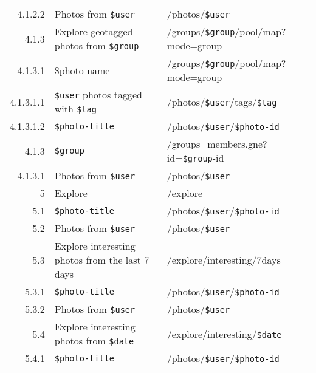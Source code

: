 \documentclass[11pt,a4paper]{article}
\newcommand{\var}[1]{\texttt{\${#1}}}
\begin{document}
\begin{center}
\begin{small}
\begin{longtable}{rp{5cm}l}
            4.1.2.2 &
            Photos from \var{user} &
            /photos/\var{user} \\

          4.1.3 &
          Explore geotagged photos from \var{group}  &
          /groups/\var{group}/pool/map?mode=group \\

            4.1.3.1 &
            \$photo-name &
            /groups/\var{group}/pool/map?mode=group \\

              4.1.3.1.1 &
              \var{user} photos tagged with \var{tag} &
              /photos/\var{user}/tags/\var{tag} \\

              4.1.3.1.2 &
              \var{photo-title} &
              /photos/\var{user}/\var{photo-id} \\

          4.1.3 &
          \var{group}  &
          /groups\_members.gne?id=\var{group}-id \\

            4.1.3.1 &
            Photos from \var{user} &
            /photos/\var{user} \\


      5 &
      Explore &
      /explore \\

        5.1 &
        \var{photo-title} &
        /photos/\var{user}/\var{photo-id} \\

        5.2 &
        Photos from \var{user} &
        /photos/\var{user} \\

        5.3 &
        Explore interesting photos from the last 7 days &
        /explore/interesting/7days \\

          5.3.1 &
          \var{photo-title} &
          /photos/\var{user}/\var{photo-id} \\

          5.3.2 &
          Photos from \var{user} &
          /photos/\var{user} \\

        5.4 &
        Explore interesting photos from \var{date} &
        /explore/interesting/\var{date} \\

          5.4.1 &
          \var{photo-title} &
          /photos/\var{user}/\var{photo-id} \\


\end{longtable}
\end{small}
\end{center}
\end{document}
